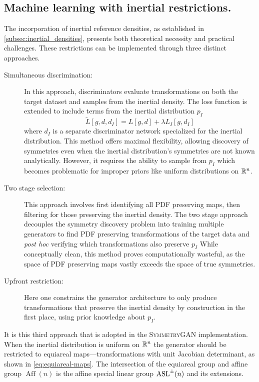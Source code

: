     \subsection{Machine learning with inertial restrictions.}
    The incorporation of inertial reference densities, as established in \cref{subsec:inertial_densities}, presents both theoretical necessity and practical challenges.
    These restrictions can be implemented through three distinct approaches.
    \begin{description}
        \item[Simultaneous discrimination:]
            In this approach, discriminators evaluate transformations on both the target dataset and samples from the inertial density.
            The loss function is extended to include terms from the inertial distribution \(p_I\)
            \[
                \widetilde L[g,d,d_I] = L[g,d] + \lambda L_I[g,d_I]
            \]
            where \(d_I\) is a separate discriminator network specialized for the inertial distribution.
            This method offers maximal flexibility, allowing discovery of symmetries even when the inertial distribution's symmetries are not known analytically.
            However, it requires the ability to sample from \(p_I\) which becomes problematic for improper priors like uniform distributions on \(\mathbb{R}^n\).
        \item[Two stage selection:]
            This approach involves first identifying all PDF preserving maps, then filtering for those preserving the inertial density.
            The two stage approach decouples the symmetry discovery problem into training multiple generators to find PDF preserving transformations of the target data and \textit{post hoc} verifying which transformations also preserve \(p_I\)
            While conceptually clean, this method proves computationally wasteful, as the space of PDF preserving maps vastly exceeds the space of true symmetries.
        \item[Upfront restriction:]
            Here one constrains the generator architecture to only produce transformations that preserve the inertial density by construction in the first place, using prior knowledge about \(p_I\).
    \end{description}
    
    It is this third approach that is adopted in the \textsc{SymmetryGAN} implementation.
    When the inertial distribution is uniform on \(\mathbb{R}^n\) the generator should be restricted to equiareal maps---transformations with unit Jacobian determinant, as shown in \cref{eq:equiareal-maps}.
    The intersection of the equiareal group and affine group \(\operatorname{Aff}(n)\) is the affine special linear group \(\operatorname{ASL}^{\pm}(n)\) and its extensions.

